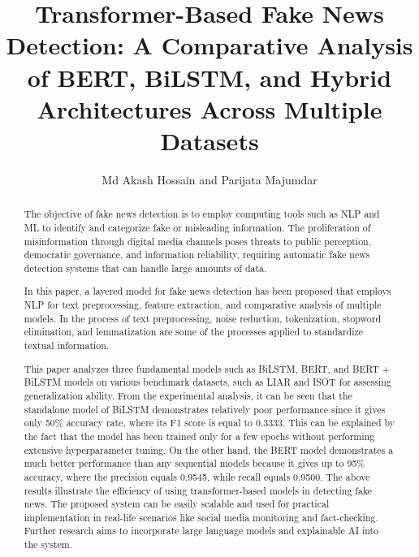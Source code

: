 \documentclass[runningheads]{llncs}
\begin{document}
\title{Transformer-Based Fake News Detection: A Comparative Analysis of BERT, BiLSTM, and Hybrid Architectures Across Multiple Datasets}


\author{Md Akash Hossain and Parijata Majumdar }

\maketitle              %

\begin{abstract}
The objective of fake news detection is to employ computing tools such as NLP and ML to identify and categorize fake or misleading information. The proliferation of misinformation through digital media channels poses threats to public perception, democratic governance, and information reliability, requiring automatic fake news detection systems that can handle large amounts of data.

In this paper, a layered model for fake news detection has been proposed that employs NLP for text preprocessing, feature extraction, and comparative analysis of multiple models. In the process of text preprocessing, noise reduction, tokenization, stopword elimination, and lemmatization are some of the processes applied to standardize textual information.

This paper analyzes three fundamental models such as BiLSTM, BERT, and BERT + BiLSTM models on various benchmark datasets, such as LIAR and ISOT for assessing generalization ability. From the experimental analysis, it can be seen that the standalone model of BiLSTM demonstrates relatively poor performance since it gives only 50\% accuracy rate, where its F1 score is equal to 0.3333. This can be explained by the fact that the model has been trained only for a few epochs without performing extensive hyperparameter tuning. On the other hand, the BERT model demonstrates a much better performance than any sequential models because it gives up to 95\% accuracy, where the precision equals 0.9545, while recall equals 0.9500.
The above results illustrate the efficiency of using transformer-based models in detecting fake news. The proposed system can be easily scalable and used for practical implementation in real-life scenarios like social media monitoring and fact-checking. Further research aims to incorporate large language models and explainable AI into the system.

\end{abstract}
\end{document}
